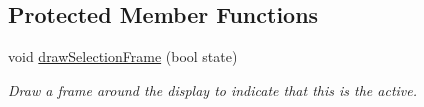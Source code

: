 \subsection*{Protected Member Functions}
\begin{DoxyCompactItemize}
\item 
\mbox{\label{classdisplay__screen_a5f27a1aa1d1ef02823cdf23a686e5593}} 
void \mbox{\hyperlink{classdisplay__screen_a5f27a1aa1d1ef02823cdf23a686e5593}{draw\+Selection\+Frame}} (bool state)
\begin{DoxyCompactList}\small\item\em Draw a frame around the display to indicate that this is the active. \end{DoxyCompactList}\end{DoxyCompactItemize}
